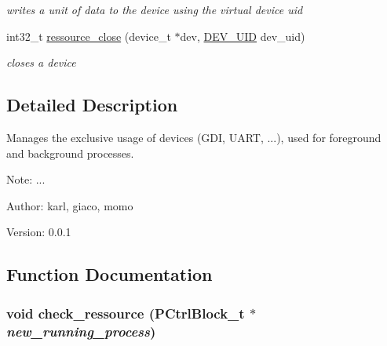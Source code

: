 \begin{CompactItemize}
\begin{CompactList}\small\item\em writes a unit of data to the device using the virtual device uid \item\end{CompactList}\item 
int32\_\-t \hyperlink{group___r_e_s_o_u_r_c_e___m_g271870da508ff83711dac2abc49871c9}{ressource\_\-close} (device\_\-t $\ast$dev, \hyperlink{group___d_e_v_i_c_e___a_p_i_g9f427f7fc1dc07b788af60c2aaa6b8d3}{DEV\_\-UID} dev\_\-uid)
\begin{CompactList}\small\item\em closes a device \item\end{CompactList}\end{CompactItemize}


\subsection{Detailed Description}
Manages the exclusive usage of devices (GDI, UART, ...), used for foreground and background processes. 

\begin{Desc}
\item[Note:]... \end{Desc}
\begin{Desc}
\item[Author:]karl, giaco, momo \end{Desc}
\begin{Desc}
\item[Version:]0.0.1 \end{Desc}


\subsection{Function Documentation}
\hypertarget{group___r_e_s_o_u_r_c_e___m_g5d470ccb4591d7168916467ba0b93b20}{
\subsubsection[{check\_\-ressource}]{\setlength{\rightskip}{0pt plus 5cm}void check\_\-ressource ({\bf PCtrlBlock\_\-t} $\ast$ {\em new\_\-running\_\-process})}}
\label{group___r_e_s_o_u_r_c_e___m_g5d470ccb4591d7168916467ba0b93b20}


